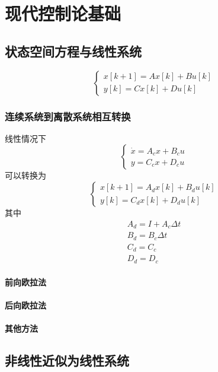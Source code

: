 \chapter{现代控制论基础}
\section{状态空间方程与线性系统}
\begin{equation*}
	\begin{cases}
		x[k+1] = Ax[k] + Bu[k]\\
		y[k] = Cx[k] + Du[k]
	\end{cases}
\end{equation*}
\subsection{连续系统到离散系统相互转换}
线性情况下
\begin{equation*}
  \begin{cases}
  	\dot{x} = A_cx + B_cu\\
  	y = C_cx + D_cu
  \end{cases}
\end{equation*}
可以转换为
\begin{equation*}
  \begin{cases}
  	x[k+1] = A_dx[k] + B_du[k]\\
  	y[k] = C_dx[k] + D_du[k]
  \end{cases}
\end{equation*}
其中
\begin{gather*}
 A_d = I + A_c\Delta t\\
 B_d = B_c \Delta t \\
 C_d = C_c\\
 D_d = D_c 
\end{gather*}
\subsubsection{前向欧拉法}
\subsubsection{后向欧拉法}
\subsubsection{其他方法}
\section{非线性近似为线性系统}
